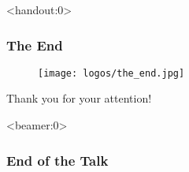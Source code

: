 \documentclass[english,xcolor=pdftex,dvipsnames,aspectratio=<+++ if course.aspectratio is defined +++><++course.aspectratio++><+++else+++>43<+++endif+++>]{beamer}
\begin{document}







      










\begin{frame}<handout:0> 
	\frametitle{The End}
	\begin{center}
		\begin{figure}
			\centering
			
			\texttt{[image: logos/the\_end.jpg]}
		\end{figure}
		Thank you for your attention!
	\end{center}
\end{frame}

\begin{frame}<beamer:0> 
	\frametitle{End of the Talk}

\end{frame}
\end{document}
